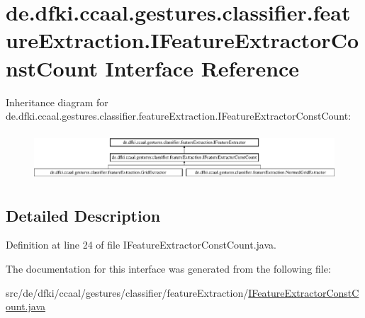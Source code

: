 \hypertarget{interfacede_1_1dfki_1_1ccaal_1_1gestures_1_1classifier_1_1feature_extraction_1_1_i_feature_extractor_const_count}{\section{de.\-dfki.\-ccaal.\-gestures.\-classifier.\-feature\-Extraction.\-I\-Feature\-Extractor\-Const\-Count Interface Reference}
\label{interfacede_1_1dfki_1_1ccaal_1_1gestures_1_1classifier_1_1feature_extraction_1_1_i_feature_extractor_const_count}
}
Inheritance diagram for de.\-dfki.\-ccaal.\-gestures.\-classifier.\-feature\-Extraction.\-I\-Feature\-Extractor\-Const\-Count\-:\begin{figure}[H]
\begin{center}
\leavevmode
\includegraphics[height=1.798715cm]{interfacede_1_1dfki_1_1ccaal_1_1gestures_1_1classifier_1_1feature_extraction_1_1_i_feature_extractor_const_count}
\end{center}
\end{figure}


\subsection{Detailed Description}


Definition at line 24 of file I\-Feature\-Extractor\-Const\-Count.\-java.



The documentation for this interface was generated from the following file\-:\begin{DoxyCompactItemize}
\item 
src/de/dfki/ccaal/gestures/classifier/feature\-Extraction/\hyperlink{_i_feature_extractor_const_count_8java}{I\-Feature\-Extractor\-Const\-Count.\-java}\end{DoxyCompactItemize}
